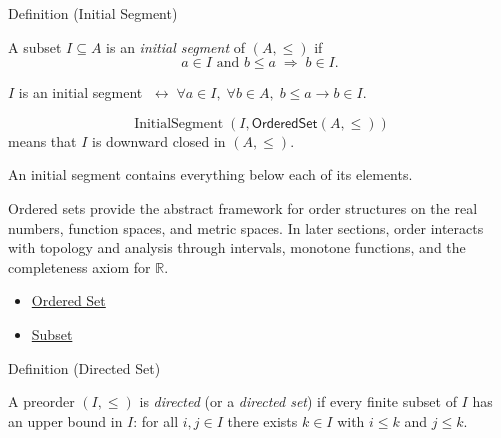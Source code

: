 \begin{definitionbox}{Definition (Initial Segment)}
\begin{definition}\label{def:initial-segment}
A subset $I \subseteq A$ is an \emph{initial segment} of $(A,\leq)$ if
\[
a \in I \text{ and } b \leq a \;\Rightarrow\; b \in I.
\]
\end{definition}
\end{definitionbox}

\begin{remark*}
$I$ is an initial segment $\;\leftrightarrow\; \forall a \in I,\; \forall b \in A,\; b \leq a \to b \in I$.
\end{remark*}

\begin{remark*}
\[
  \operatorname{InitialSegment}(I,\mathsf{OrderedSet}(A,\leq))
\] means that $I$
is downward closed in $(A,\leq)$.
\end{remark*}

\begin{remark*}[Interpretation]
An initial segment contains everything below each of its elements.
\end{remark*}

\begin{remark*}[Exposition]
Ordered sets provide the abstract framework for order structures on the real
numbers, function spaces, and metric spaces. In later sections, order
interacts with topology and analysis through intervals, monotone functions,
and the completeness axiom for $\mathbb{R}$.
\end{remark*}

\begin{dependencies}
\begin{itemize}
  \item \hyperref[def:ordered-set]{Ordered Set}
  \item \hyperref[def:subset]{Subset}
\end{itemize}
\end{dependencies}


\begin{definitionbox}{Definition (Directed Set)}
\begin{definition}\label{def:directed-set}
A preorder $(I, \leq)$ is \emph{directed} (or a \emph{directed set}) if every
finite subset of $I$ has an upper bound in $I$: for all $i, j \in I$ there
exists $k \in I$ with $i \leq k$ and $j \leq k$.
\end{definition}
\end{definitionbox}

